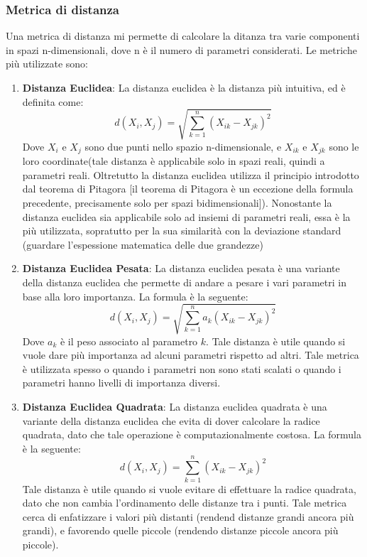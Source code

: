 \subsubsection{Metrica di distanza}
Una metrica di distanza mi permette di calcolare la ditanza tra varie componenti in spazi n-dimensionali, dove n è il numero di parametri considerati. Le metriche più utilizzate sono:
\begin{enumerate}
    \item \textbf{Distanza Euclidea}: La distanza euclidea è la distanza più intuitiva, ed è definita come:
    \[d(X_i,X_j) = \sqrt{\sum_{k=1}^{n}(X_{ik} - X_{jk})^2}\]
    Dove \(X_i\) e \(X_j\) sono due punti nello spazio n-dimensionale, e \(X_{ik}\) e \(X_{jk}\) sono le loro coordinate(tale distanza è applicabile solo in spazi reali, quindi a parametri reali. Oltretutto la distanza euclidea utilizza il principio introdotto dal teorema di Pitagora [il teorema di Pitagora è un eccezione della formula precedente, precisamente solo per spazi bidimensionali]).
    Nonostante la distanza euclidea sia applicabile solo ad insiemi di parametri reali, essa è la più utilizzata, sopratutto per la sua similarità con la deviazione standard (guardare l'espessione matematica delle due grandezze)

    \item \textbf{Distanza Euclidea Pesata}: La distanza euclidea pesata è una variante della distanza euclidea che permette di andare a pesare i vari parametri in base alla loro importanza. La formula è la seguente:
    \[d(X_i,X_j) = \sqrt{\sum_{k=1}^{n}a_k(X_{ik} - X_{jk})^2}\]
    Dove \(a_k\) è il peso associato al parametro \(k\). Tale distanza è utile quando si vuole dare più importanza ad alcuni parametri rispetto ad altri. Tale metrica è utilizzata spesso o quando i parametri non sono stati scalati o quando i parametri hanno livelli di importanza diversi.

    \item \textbf{Distanza Euclidea Quadrata}: La distanza euclidea quadrata è una variante della distanza euclidea che evita di dover calcolare la radice quadrata, dato che tale operazione è computazionalmente costosa. La formula è la seguente:
    \[d(X_i,X_j) = \sum_{k=1}^{n}(X_{ik} - X_{jk})^2\]
    Tale distanza è utile quando si vuole evitare di effettuare la radice quadrata, dato che non cambia l'ordinamento delle distanze tra i punti. Tale metrica cerca di enfatizzare i valori più distanti (rendend distanze grandi ancora più grandi), e favorendo quelle piccole (rendendo distanze piccole ancora più piccole).
    

\end{enumerate}
